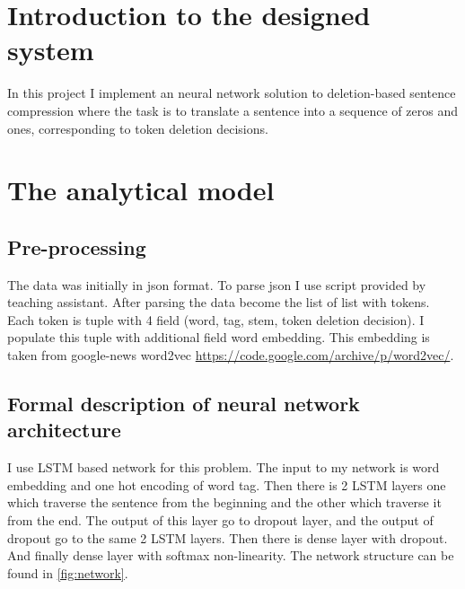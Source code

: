 \documentclass[a4paper,12pt,oneside]{article}
\begin{document}
\section {Introduction to the designed system}
In this project I implement an neural network solution to deletion-based sentence compression where the task is to translate a sentence into a sequence of zeros and ones, corresponding to token deletion decisions.

\section {The analytical model}

\subsection{Pre-processing}
The data was initially in json format. To parse json I use script provided by teaching assistant. After parsing the data become the list of list with tokens. Each token is tuple with 4 field (word, tag, stem, token deletion decision). I populate this tuple with additional field word embedding. This embedding is taken from google-news word2vec \url{https://code.google.com/archive/p/word2vec/}.

\subsection{Formal description of neural network architecture}
I use LSTM based network for this problem. The input to my network is word embedding and one hot encoding of word tag. Then there is 2 LSTM layers one which traverse the sentence from the beginning and the other which traverse it from the end. The output of this layer go to dropout layer, and the output of dropout go to the same 2 LSTM layers. Then there is dense layer with dropout. And finally dense layer with softmax non-linearity. The network structure can be found in \cref{fig:network}.
\end{document}
